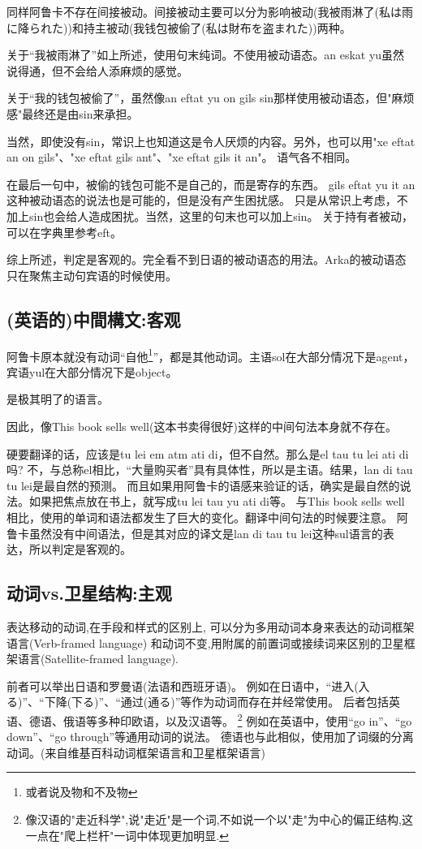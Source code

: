 同样阿鲁卡不存在间接被动。间接被动主要可以分为影响被动(我被雨淋了(私は雨に降られた))和持主被动(我钱包被偷了(私は財布を盗まれた))两种。

关于“我被雨淋了”如上所述，使用句末纯词。不使用被动语态。an eskat yu虽然说得通，但不会给人添麻烦的感觉。

关于“我的钱包被偷了”，虽然像an eftat yu on gils sin那样使用被动语态，但"麻烦感"最终还是由sin来承担。

当然，即使没有sin，常识上也知道这是令人厌烦的内容。另外，也可以用"xe eftat an on gils"、"xe eftat gils ant"、"xe eftat gils it an"。
语气各不相同。

在最后一句中，被偷的钱包可能不是自己的，而是寄存的东西。
gils eftat yu it an这种被动语态的说法也是可能的，但是没有产生困扰感。
只是从常识上考虑，不加上sin也会给人造成困扰。当然，这里的句末也可以加上sin。
关于持有者被动，可以在字典里参考eft。

综上所述，判定是客观的。完全看不到日语的被动语态的用法。Arka的被动语态只在聚焦主动句宾语的时候使用。

\subsection{(英语的)中間構文:客观}

阿鲁卡原本就没有动词“自他\footnote{或者说及物和不及物}”，都是其他动词。主语sol在大部分情况下是agent，宾语yul在大部分情况下是object。

是极其明了的语言。

因此，像This book sells well(这本书卖得很好)这样的中间句法本身就不存在。

硬要翻译的话，应该是tu lei em atm ati di，但不自然。那么是el tau tu lei ati di吗?
不，与总称el相比，“大量购买者”具有具体性，所以是主语。结果，lan di tau tu lei是最自然的预测。
而且如果用阿鲁卡的语感来验证的话，确实是最自然的说法。如果把焦点放在书上，就写成tu lei tau yu ati di等。
与This book sells well相比，使用的单词和语法都发生了巨大的变化。翻译中间句法的时候要注意。
阿鲁卡虽然没有中间语法，但是其对应的译文是lan di tau tu lei这种sul语言的表达，所以判定是客观的。

\subsection{动词vs.卫星结构:主观}
表达移动的动词,在手段和样式的区别上,
可以分为多用动词本身来表达的动词框架语言(Verb-framed language)
和动词不变,用附属的前置词或接续词来区别的卫星框架语言(Satellite-framed language).

前者可以举出日语和罗曼语(法语和西班牙语)。
例如在日语中，“进入(入る)”、“下降(下る)”、“通过(通る)”等作为动词而存在并经常使用。
后者包括英语、德语、俄语等多种印欧语，以及汉语等。
\footnote{像汉语的"走近科学",说"走近"是一个词,不如说一个以"走"为中心的偏正结构,这一点在"爬上栏杆"一词中体现更加明显.}
例如在英语中，使用“go in”、“go down”、“go through”等通用动词的说法。
德语也与此相似，使用加了词缀的分离动词。(来自维基百科动词框架语言和卫星框架语言)

